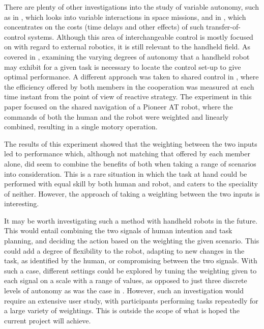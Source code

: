 \documentclass[11pt]{article}
\begin{document}
There are plenty of other investigations into the study of variable autonomy, such as in \cite{Dorais1999}, which looks into variable interactions in space missions, and in \cite{tambe2002}, which concentrates on the costs (time delays and other effects) of such transfer-of-control systems. Although this area of interchangeable control is mostly focused on with regard to external robotics, it is still relevant to the handheld field. As covered in \cite{GreggSmithDesign}, examining the varying degrees of autonomy that a handheld robot may exhibit for a given task is necessary to locate the control set-up to give optimal performance.
A different approach was taken to shared control in \cite{Poncela2009}, where the efficiency offered by both members in the cooperation was measured at each time instant from the point of view of reactive strategy. The experiment in this paper focused on the shared navigation of a Pioneer AT robot, where the commands of both the human and the robot were weighted and linearly combined, resulting in a single motory operation.

The results of this experiment showed that the weighting between the two inputs led to performance which, although not matching that offered by each member alone, did seem to combine the benefits of both when taking a range of scenarios into consideration. This is a rare situation in which the task at hand could be performed with equal skill by both human and robot, and caters to the speciality of neither. However, the approach of taking a weighting between the two inputs is interesting. 

It may be worth investigating such a method with handheld robots in the future. This would entail combining the two signals of human intention and task planning, and deciding the action based on the weighting the given scenario. This could add a degree of flexibility to the robot, adapting to new changes in the task, as identified by the human, or compromising between the two signals. With such a case, different settings could be explored by tuning the weighting given to each signal on a scale with a range of values, as opposed to just three discrete levels of autonomy as was the case in \cite{GreggSmithDesign}. However, such an investigation would require an extensive user study, with participants performing tasks repeatedly for a large variety of weightings. This is outside the scope of what is hoped the current project will achieve.
\end{document}
